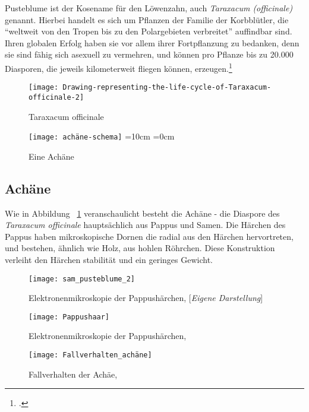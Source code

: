 Pusteblume ist der Kosename für den Löwenzahn, auch \textit{Taraxacum (officinale)} genannt.
Hierbei handelt es sich um Pflanzen der Familie der Korbblütler,
die \enquote{weltweit von den Tropen bis zu den Polargebieten verbreitet} auffindbar sind.\\

\noindent
Ihren globalen Erfolg haben sie vor allem ihrer Fortpflanzung zu bedanken,
denn sie sind fähig sich asexuell zu vermehren, und können pro Pflanze bis zu 20.000 Diasporen, die jeweils kilometerweit fliegen können, erzeugen.\footcite{Taraxacum}


\begin{figure}[h]
    \centering
    \begin{minipage}{0.45\textwidth}
        \centering
        \texttt{[image: Drawing-representing-the-life-cycle-of-Taraxacum-officinale-2]}
        \caption{Taraxacum officinale\cite[, Fig 2.1]{tesi}}
    \end{minipage}
    \hfill
    \begin{minipage}{0.5\textwidth}
        \centering
        \hbox
        {\texttt{[image: achäne-schema]}}
        =10cm %
        =0cm
        \caption{Eine Achäne \cite[\textit{in Anlehnung an}][, Fig 1.1]{tesi}}
        \label{fig:figure3}
    \end{minipage}
\end{figure}

\newpage

\subsection{Achäne}\label{subsec:achane}

Wie in Abbildung ~\ref{fig:figure3} veranschaulicht besteht die Achäne - die Diaspore des \textit{Taraxacum officinale} hauptsächlich aus Pappus und Samen.
Die Härchen des Pappus haben mikroskopische Dornen die radial aus den Härchen hervortreten,
und bestehen, ähnlich wie Holz, aus hohlen Röhrchen.
Diese Konstruktion verleiht den Härchen stabilität und ein geringes Gewicht.

\begin{figure}[h]
    \centering
    \begin{minipage}{0.4\textwidth}
        \centering
        \texttt{[image: sam\_pusteblume\_2]}
        \caption{Elektronenmikroskopie der Pappushärchen, [\textit{Eigene Darstellung}]}
        \label{fig:emk_1}
        \texttt{[image: Pappushaar]}%
        \caption{Elektronenmikroskopie der Pappushärchen, \cite[, Fig. 9]{morph}}
        \label{fig:emk_2}
    \end{minipage}
    \hfill
    \begin{minipage}{0.3\textwidth}
        \centering
        \texttt{[image: Fallverhalten\_achäne]}%
        \caption{Fallverhalten der Achäe, \cite[, Fig. 4]{morph}}
        \label{fig:flt}
    \end{minipage}
\end{figure}

